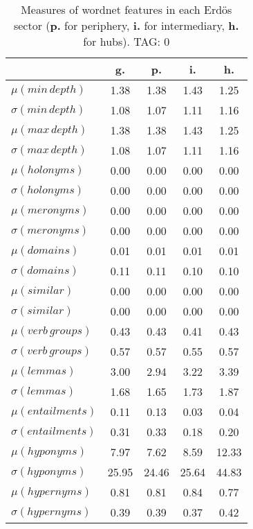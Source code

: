 \begin{table}[h!]
\begin{center}
\begin{tabular}{| l || c | c | c | c |}\hline
 & {\bf g.} & {\bf p.} & {\bf i.} & {\bf h.} \\\hline\hline
$\mu(min\,depth)$ & 1.38  & 1.38  & 1.43  & 1.25 \\
$\sigma(min\,depth)$ & 1.08  & 1.07  & 1.11  & 1.16 \\\hline
$\mu(max\,depth)$ & 1.38  & 1.38  & 1.43  & 1.25 \\
$\sigma(max\,depth)$ & 1.08  & 1.07  & 1.11  & 1.16 \\\hline
$\mu(holonyms)$ & 0.00  & 0.00  & 0.00  & 0.00 \\
$\sigma(holonyms)$ & 0.00  & 0.00  & 0.00  & 0.00 \\\hline
$\mu(meronyms)$ & 0.00  & 0.00  & 0.00  & 0.00 \\
$\sigma(meronyms)$ & 0.00  & 0.00  & 0.00  & 0.00 \\\hline
$\mu(domains)$ & 0.01  & 0.01  & 0.01  & 0.01 \\
$\sigma(domains)$ & 0.11  & 0.11  & 0.10  & 0.10 \\\hline
$\mu(similar)$ & 0.00  & 0.00  & 0.00  & 0.00 \\
$\sigma(similar)$ & 0.00  & 0.00  & 0.00  & 0.00 \\\hline
$\mu(verb\,groups)$ & 0.43  & 0.43  & 0.41  & 0.43 \\
$\sigma(verb\,groups)$ & 0.57  & 0.57  & 0.55  & 0.57 \\\hline
$\mu(lemmas)$ & 3.00  & 2.94  & 3.22  & 3.39 \\
$\sigma(lemmas)$ & 1.68  & 1.65  & 1.73  & 1.87 \\\hline
$\mu(entailments)$ & 0.11  & 0.13  & 0.03  & 0.04 \\
$\sigma(entailments)$ & 0.31  & 0.33  & 0.18  & 0.20 \\\hline
$\mu(hyponyms)$ & 7.97  & 7.62  & 8.59  & 12.33 \\
$\sigma(hyponyms)$ & 25.95  & 24.46  & 25.64  & 44.83 \\\hline
$\mu(hypernyms)$ & 0.81  & 0.81  & 0.84  & 0.77 \\
$\sigma(hypernyms)$ & 0.39  & 0.39  & 0.37  & 0.42 \\\hline
\end{tabular}
\caption{Measures of wordnet features in each Erd\"os sector ({{\bf p.}} for periphery, {{\bf i.}} for intermediary, {{\bf h.}} for hubs). TAG: 0}
\end{center}
\end{table}